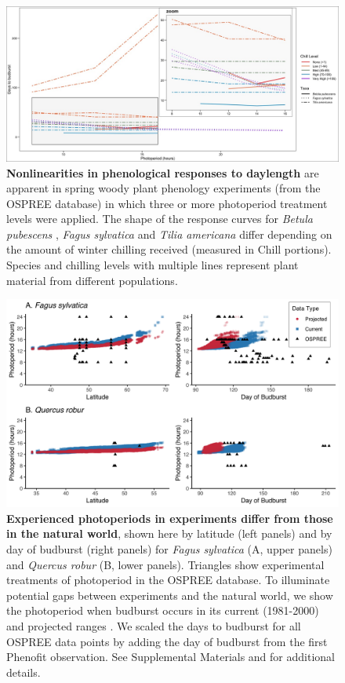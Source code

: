 \documentclass{article}
\begin{document}
 
\begin{figure}[p]
\includegraphics{..//..//analyses/photoperiod/figures/Photo_curv_FINAL.jpeg} 
\caption{\textbf{Nonlinearities in phenological responses to daylength} are apparent in spring woody plant phenology experiments (from the OSPREE database) in which three or more photoperiod treatment levels were applied. The shape of the response curves for \textit{Betula pubescens} \citep{Caffarra:2011b}, \textit{Fagus sylvatica} \citep{Heide:1993a} and \textit{Tilia americana} \citep{Ashby:1962aa} differ depending on the amount of winter chilling received (measured in Chill portions). Species and chilling levels with multiple lines represent plant material from different populations.}


 \label{fig:photocurve}
 \end{figure}

\begin{figure}[p]
\includegraphics{..//..//analyses/photoperiod/figures/2D_actual_combined.png} 
\caption{\textbf{Experienced photoperiods in experiments differ from those in the natural world}, shown here by latitude (left panels) and by day of budburst (right panels) for \emph{Fagus sylvatica} (A, upper panels) and \emph{Quercus robur} (B, lower panels). Triangles show experimental treatments of photoperiod in the OSPREE database. To illuminate potential gaps between experiments and the natural world, we show the photoperiod when budburst occurs in its current (1981-2000) and projected ranges \citep[2081-2100, using the A1Fi Phenofit scenario, see][]{duputie2015}. We scaled the days to budburst for all OSPREE data points by adding the day of budburst from the first Phenofit observation. See Supplemental Materials and \citet{duputie2015} for additional details.} 
 \label{fig:fagus}
 \end{figure}
 
\end{document}
